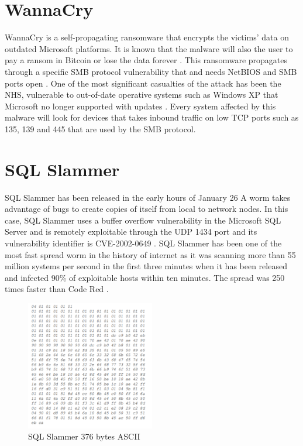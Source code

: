 \section{WannaCry}
\label{s:WannaCry}
WannaCry is a self-propagating ransomware that encrypts the victims' data on
outdated Microsoft platforms. It is known that the malware will also the user to pay a
ransom in Bitcoin or lose the data forever \citep{qianICMLA201716th2017}. This ransomware
propagates through a specific SMB protocol vulnerability that and needs NetBIOS
and SMB ports open \citep{nhsWannaCryRansomwareUsing2017}. One of the most
significant casualties of the attack has been the NHS, vulnerable to out-of-date
operative systems such as Windows XP that Microsoft no longer supported with
updates \citep{qianICMLA201716th2017}. Every system affected by this malware will look for
devices that takes inbound traffic on low TCP ports such as 135, 139 and 445
that are used by the SMB protocol.

\section{SQL Slammer}
\label{s:SQL-Slammer}
SQL Slammer has been released in the early hours of January 26 A worm takes
advantage of bugs to create copies of itself from local to network nodes. In
this case, SQL Slammer uses a buffer overflow vulnerability in the Microsoft SQL
Server and is remotely exploitable through the UDP 1434 port and its
vulnerability identifier is CVE-2002-0649 \citep{cveCVE200206492009}. SQL
Slammer has been one of the most fast spread worm in the history of internet as
it was scanning more than 55 million systems per second in the first three
minutes when it has been released and infected 90\% of exploitable hosts within
ten minutes. The spread was 250 times faster than Code Red
\citep{hoarTrendsCybercrimeDark2005}.

\begin{figure}[ht]
  \centering
  \includegraphics[width=0.5\textwidth]{figures/sql-slammer}
  \caption{SQL Slammer 376 bytes ASCII}
  \label{f:sql-slammer}
\end{figure}

